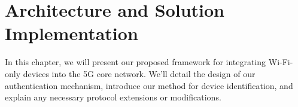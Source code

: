 \chapter{Architecture and Solution Implementation}%
\label{chapter:architecture-and-solution-implementation}

\begin{introduction}
In this chapter, we will present our proposed framework for integrating Wi-Fi-only devices into the 5G core network. We'll detail the design of our authentication mechanism, introduce our method for device identification, and explain any necessary protocol extensions or modifications.
\end{introduction}